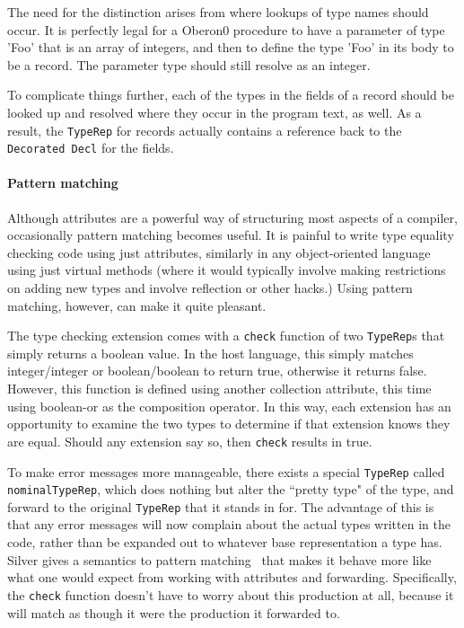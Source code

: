 The need for the distinction arises from where lookups of type names should
occur.
%
It is perfectly legal for a Oberon0 procedure to have a parameter of type
'Foo' that is an array of integers, and then to define the type 'Foo' in
its body to be a record.
%
The parameter type should still resolve as an integer.

To complicate things further, each of the types in the fields of a record should be
looked up and resolved where they occur in the program text, as well.
%
As a result, the \texttt{TypeRep} for records actually contains a reference
back to the \texttt{Decorated Decl} for the fields.


\paragraph{Pattern matching}
Although attributes are a powerful way of structuring most aspects of a compiler,
occasionally pattern matching becomes useful.
%
It is painful to write type equality checking code using just attributes,
similarly in any object-oriented language using just virtual methods
(where it would typically involve making restrictions on adding new types
and involve reflection or other hacks.)
%
Using pattern matching, however, can make it quite pleasant.

The type checking extension comes with a \texttt{check} function of two
\texttt{TypeRep}s that simply returns a boolean value.
%
In the host language, this simply matches integer/integer or boolean/boolean
to return true, otherwise it returns false.
%
However, this function is defined using another collection attribute,
this time using boolean-or as the composition operator.
%
In this way, each extension has an opportunity to examine the two types to
determine if that extension knows they are equal.
%
Should any extension say so, then \texttt{check} results in true.

To make error messages more manageable, there exists a special \texttt{TypeRep}
called \texttt{nominalTypeRep}, which does nothing but alter the ``pretty type"
of the type, and forward to the original \texttt{TypeRep} that it stands in for.
%
The advantage of this is that any error messages will now complain about the
actual types written in the code, rather than be expanded out to whatever
base representation a type has.
%
Silver gives a semantics to pattern matching~\cite{kaminski11sle} that makes it
behave more like what one would expect from working with attributes and
forwarding.
%
Specifically, the \texttt{check} function doesn't have to worry about this
production at all, because it will match as though it were the production
it forwarded to.

